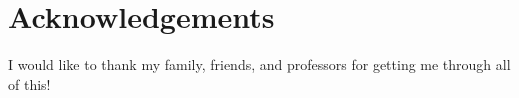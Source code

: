 \section*{Acknowledgements}
\thispagestyle{empty}

I would like to thank my family, friends, and professors for getting me through all of this!
